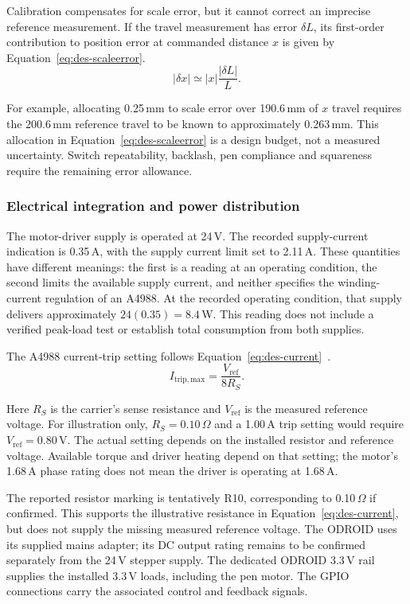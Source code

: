 Calibration compensates for scale error, but it cannot correct an imprecise reference measurement. If the travel measurement has error $\delta L$, its first-order contribution to position error at commanded distance $x$ is given by Equation~\ref{eq:des-scaleerror}.
\begin{equation}
|\delta x|\simeq |x|\frac{|\delta L|}{L}.
\label{eq:des-scaleerror}
\end{equation}

For example, allocating 0.25\,mm to scale error over 190.6\,mm of $x$ travel requires the 200.6\,mm reference travel to be known to approximately 0.263\,mm. This allocation in Equation~\ref{eq:des-scaleerror} is a design budget, not a measured uncertainty. Switch repeatability, backlash, pen compliance and squareness require the remaining error allowance.

\subsubsection{Electrical integration and power distribution}
\label{sec:des-power}
The motor-driver supply is operated at 24\,V. The recorded supply-current indication is 0.35\,A, with the supply current limit set to 2.11\,A. These quantities have different meanings: the first is a reading at an operating condition, the second limits the available supply current, and neither specifies the winding-current regulation of an A4988. At the recorded operating condition, that supply delivers approximately $24(0.35)=8.4$\,W. This reading does not include a verified peak-load test or establish total consumption from both supplies.


The A4988 current-trip setting follows Equation~\ref{eq:des-current}~\cite[p.~9]{a4988ds}.
\begin{equation}
I_{\mathrm{trip,max}}=\frac{V_{\mathrm{ref}}}{8R_S}.
\label{eq:des-current}
\end{equation}

Here $R_S$ is the carrier's sense resistance and $V_{\mathrm{ref}}$ is the measured reference voltage. For illustration only, $R_S=0.10\,\Omega$ and a 1.00\,A trip setting would require $V_{\mathrm{ref}}=0.80$\,V. The actual setting depends on the installed resistor and reference voltage. Available torque and driver heating depend on that setting; the motor's 1.68\,A phase rating does not mean the driver is operating at 1.68\,A.

The reported resistor marking is tentatively R10, corresponding to 0.10\,$\Omega$ if confirmed. This supports the illustrative resistance in Equation~\ref{eq:des-current}, but does not supply the missing measured reference voltage. The ODROID uses its supplied mains adapter; its DC output rating remains to be confirmed separately from the 24\,V stepper supply. The dedicated ODROID 3.3\,V rail supplies the installed 3.3\,V loads, including the pen motor. The GPIO connections carry the associated control and feedback signals.

